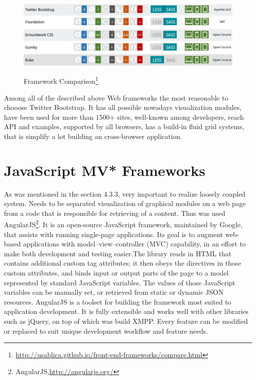	\begin{figure}[!ht]
	\centering
	\includegraphics[scale=0.7]{images/Bootstrap&Foundation.png}
	\includegraphics[scale=0.7]{images/Groundwork&Gumby.png} 
	\includegraphics[scale=0.7]{images/Kube.png}  
	\caption[Framework Comparison]{Framework Comparison\footnote{\url{http://usablica.github.io/front-end-frameworks/compare.html}}}
	\label{img:Bootstrap&Foundation.png}
	\label{img:Groundwork&Gumby.png}   
	\label{img:Kube.png}                          
	\end{figure}

 Among all of the described above Web frameworks the most reasonable to chooose Twitter Bootstrap. It has all possible nowadays visualization modules, have been used for more than 1500+ sites, well-known among developers, reach API and examples, supported by all browsers, has a build-in fluid grid systems, that is simplify a lot building an cross-browser application.

\section{JavaScript MV* Frameworks}
	As was mentioned in the section 4.3.3, very important to realize loosely coupled system. Needs to be separated visualization of graphical modules on a web page from a code that is responsible for retrieving of a content. Thus was used AngularJS\footnote{AngularJS,\url{http://angularjs.org/}}. It is an open-source JavaScript framework, maintained by Google, that assists with running single-page applications. Its goal is to augment web-based applications with model–view–controller (MVC) capability, in an effort to make both development and testing easier.The library reads in HTML that contains additional custom tag attributes; it then obeys the directives in those custom attributes, and binds input or output parts of the page to a model represented by standard JavaScript variables. The values of those JavaScript variables can be manually set, or retrieved from static or dynamic JSON resources\cite{ wiki:angular}. AngularJS is a toolset for building the framework most suited to application development. It is fully extensible and works well with other libraries such as jQuery, on top of which was build XMPP. Every feature can be modified or replaced to suit unique development workflow and feature needs.

